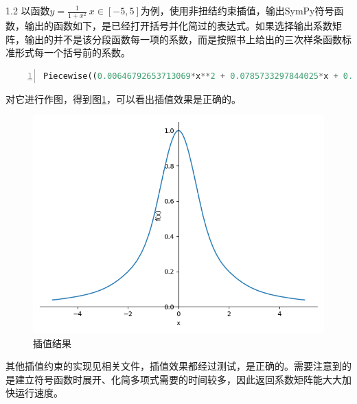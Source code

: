 \documentclass[a4paper,twoside]{article}
\begin{document}
\begin{spacing}{1.2}
以函数$y=\frac{1}{1+x^2} \ x \in [-5,5]$为例，使用非扭结约束插值，输出SymPy符号函数，输出的函数如下，是已经打开括号并化简过的表达式。如果选择输出系数矩阵，输出的并不是该分段函数每一项的系数，而是按照书上给出的三次样条函数标准形式每一个括号前的系数。

\begin{lstlisting}[language=Python,numbers=left,style=PythonStyle,caption=输出的结果,label={code:d1}]
Piecewise((0.00646792653713069*x**2 + 0.0785733297844025*x + 0.269630023955284, (x >= -5) & (x < -4)), (0.00787862656374767*x**3 + 0.101011445302103*x**2 + 0.456747404844291*x + 0.773862124035135, (x >= -4) & (x < -3)), (0.00649454351876496*x**3 + 0.0885546978972584*x**2 + 0.419377162629758*x + 0.736491881820602, (x >= -3) & (x < -2)), (0.107319669949428*x**3 + 0.693505456481235*x**2 + 1.62927867979771*x + 1.5430928932659, (x >= -2) & (x < -1)), (-0.435773223316476*x**3 - 0.935773223316476*x**2 + 1, (x >= -1) & (x < 0)), (0.435773223316476*x**3 - 0.935773223316476*x**2 + 1.11022302462516e-16*x + 1, (x >= 0) & (x < 1)), (-0.107319669949428*x**3 + 0.693505456481235*x**2 - 1.62927867979771*x + 1.5430928932659, (x >= 1) & (x < 2)), (-0.00649454351876498*x**3 + 0.0885546978972585*x**2 - 0.419377162629758*x + 0.736491881820602, (x >= 2) & (x < 3)), (-0.00787862656374766*x**3 + 0.101011445302103*x**2 - 0.45674740484429*x + 0.773862124035134, (x >= 3) & (x < 4)), (0.0064679265371307*x**2 - 0.0785733297844025*x + 0.269630023955284, (x >= 4) & (x < 5)))
\end{lstlisting}


对它进行作图，得到图\ref{fig:result}，可以看出插值效果是正确的。

\begin{figure}[h]
	\centering
	\caption{插值结果}
	\label{fig:result}
	\includegraphics[width=0.5\linewidth]{test.png}
\end{figure}

其他插值约束的实现见相关文件，插值效果都经过测试，是正确的。需要注意到的是建立符号函数时展开、化简多项式需要的时间较多，因此返回系数矩阵能大大加快运行速度。


\end{spacing}
\end{document}
